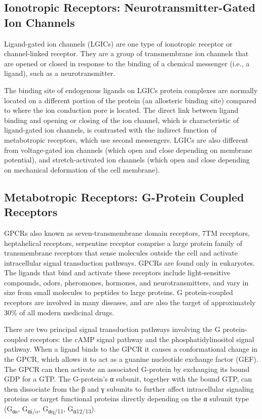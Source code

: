 \documentclass[]{book}
\begin{document}
\hypertarget{ionotropic-receptors-neurotransmitter-gated-ion-channels}{%
\subsection{Ionotropic Receptors: Neurotransmitter-Gated Ion Channels}\label{ionotropic-receptors-neurotransmitter-gated-ion-channels}}

Ligand-gated ion channels (LGICs) are one type of ionotropic receptor or channel-linked receptor. They are a group of transmembrane ion channels that are opened or closed in response to the binding of a chemical messenger (i.e., a ligand), such as a neurotransmitter.

The binding site of endogenous ligands on LGICs protein complexes are normally located on a different portion of the protein (an allosteric binding site) compared to where the ion conduction pore is located. The direct link between ligand binding and opening or closing of the ion channel, which is characteristic of ligand-gated ion channels, is contrasted with the indirect function of metabotropic receptors, which use second messengers. LGICs are also different from voltage-gated ion channels (which open and close depending on membrane potential), and stretch-activated ion channels (which open and close depending on mechanical deformation of the cell membrane).

\hypertarget{metabotropic-receptors-g-protein-coupled-receptors}{%
\subsection{Metabotropic Receptors: G-Protein Coupled Receptors}\label{metabotropic-receptors-g-protein-coupled-receptors}}

GPCRs also known as seven-transmembrane domain receptors, 7TM receptors, heptahelical receptors, serpentine receptor comprise a large protein family of transmembrane receptors that sense molecules outside the cell and activate intracellular signal transduction pathways. GPCRs are found only in eukaryotes. The ligands that bind and activate these receptors include light-sensitive compounds, odors, pheromones, hormones, and neurotransmitters, and vary in size from small molecules to peptides to large proteins. G protein-coupled receptors are involved in many diseases, and are also the target of approximately 30\% of all modern medicinal drugs.

There are two principal signal transduction pathways involving the G protein-coupled receptors: the cAMP signal pathway and the phosphatidylinositol signal pathway. When a ligand binds to the GPCR it causes a conformational change in the GPCR, which allows it to act as a guanine nucleotide exchange factor (GEF). The GPCR can then activate an associated G-protein by exchanging its bound GDP for a GTP. The G-protein's α subunit, together with the bound GTP, can then dissociate from the β and γ subunits to further affect intracellular signaling proteins or target functional proteins directly depending on the α subunit type (G\textsubscript{αs}, G\textsubscript{αi/o}, G\textsubscript{αq/11}, G\textsubscript{α12/13}).
\end{document}
